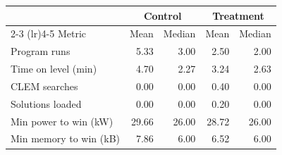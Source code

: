 \begin{tabular}{lrrrr}
\toprule
 & \multicolumn{2}{c}{Control} & \multicolumn{2}{c}{Treatment} \\
\cmidrule(lr){2-3} \cmidrule(lr){4-5}
Metric & Mean & Median & Mean & Median \\
\midrule
Program runs & 5.33 & 3.00 & 2.50 & 2.00 \\
Time on level (min) & 4.70 & 2.27 & 3.24 & 2.63 \\
CLEM searches & 0.00 & 0.00 & 0.40 & 0.00 \\
Solutions loaded & 0.00 & 0.00 & 0.20 & 0.00 \\
Min power to win (kW) & 29.66 & 26.00 & 28.72 & 26.00 \\
Min memory to win (kB) & 7.86 & 6.00 & 6.52 & 6.00 \\
\bottomrule
\end{tabular}
